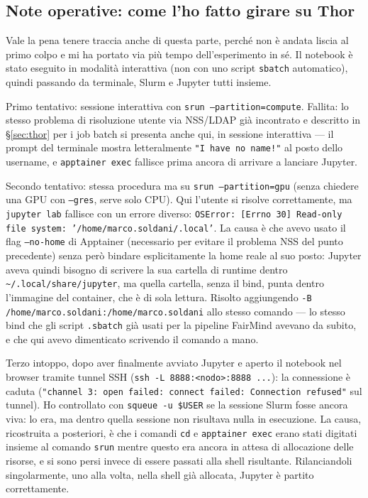 \subsection*{Note operative: come l'ho fatto girare su Thor}

Vale la pena tenere traccia anche di questa parte, perché non è andata liscia al primo colpo e mi ha portato via più tempo dell'esperimento in sé. Il notebook è stato eseguito in modalità interattiva (non con uno script \texttt{sbatch} automatico), quindi passando da terminale, Slurm e Jupyter tutti insieme.

Primo tentativo: sessione interattiva con \texttt{srun --partition=compute}. Fallita: lo stesso problema di risoluzione utente via NSS/LDAP già incontrato e descritto in \S\ref{sec:thor} per i job batch si presenta anche qui, in sessione interattiva --- il prompt del terminale mostra letteralmente \texttt{"I have no name!"} al posto dello username, e \texttt{apptainer exec} fallisce prima ancora di arrivare a lanciare Jupyter.

Secondo tentativo: stessa procedura ma su \texttt{srun --partition=gpu} (senza chiedere una GPU con \texttt{--gres}, serve solo CPU). Qui l'utente si risolve correttamente, ma \texttt{jupyter lab} fallisce con un errore diverso: \texttt{OSError: [Errno 30] Read-only file system: '/home/marco.soldani/.local'}. La causa è che avevo usato il flag \texttt{--no-home} di Apptainer (necessario per evitare il problema NSS del punto precedente) senza però bindare esplicitamente la home reale al suo posto: Jupyter aveva quindi bisogno di scrivere la sua cartella di runtime dentro \texttt{\textasciitilde/.local/share/jupyter}, ma quella cartella, senza il bind, punta dentro l'immagine del container, che è di sola lettura. Risolto aggiungendo \texttt{-B /home/marco.soldani:/home/marco.soldani} allo stesso comando --- lo stesso bind che gli script \texttt{.sbatch} già usati per la pipeline FairMind avevano da subito, e che qui avevo dimenticato scrivendo il comando a mano.

Terzo intoppo, dopo aver finalmente avviato Jupyter e aperto il notebook nel browser tramite tunnel SSH (\texttt{ssh -L 8888:<nodo>:8888 ...}): la connessione è caduta (\texttt{"channel 3: open failed: connect failed: Connection refused"} sul tunnel). Ho controllato con \texttt{squeue -u \$USER} se la sessione Slurm fosse ancora viva: lo era, ma dentro quella sessione non risultava nulla in esecuzione. La causa, ricostruita a posteriori, è che i comandi \texttt{cd} e \texttt{apptainer exec} erano stati digitati insieme al comando \texttt{srun} mentre questo era ancora in attesa di allocazione delle risorse, e si sono persi invece di essere passati alla shell risultante. Rilanciandoli singolarmente, uno alla volta, nella shell già allocata, Jupyter è partito correttamente.

